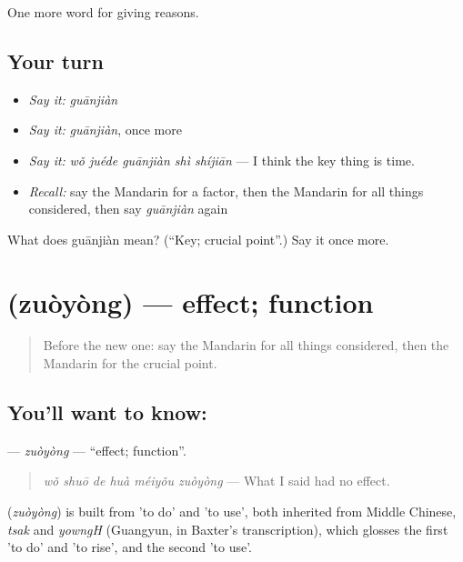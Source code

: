 \begin{grammarlens}[title={What you've built}]
One more word for giving reasons.
\end{grammarlens}

\subsection*{Your turn}
\begin{itemize}
\raggedright
  \item \emph{Say it:} \emph{guānjiàn}
  \item \emph{Say it:} \emph{guānjiàn}, once more
  \item \emph{Say it:} \emph{wǒ juéde guānjiàn shì shíjiān} — I think the key thing is time.
  \item \emph{Recall:} say the Mandarin for a factor, then the Mandarin for all things considered, then say \emph{guānjiàn} again
\end{itemize}

\begin{tcolorbox}[breakable,colback=teal!4,colframe=teal!35!black,title={Before you move on}]
What does guānjiàn mean? (\textquotedblleft{}Key; crucial point\textquotedblright{}.) Say it once more.
\end{tcolorbox}
\section[\texorpdfstring{\zh{作用} (zuòyòng)}{作用 (zuòyòng)}]{ (zuòyòng) — effect; function}

\label{lesson:ZH-C370-zuoyong}



\begin{quote}
Before the new one: say the Mandarin for all things considered, then the Mandarin for the crucial point.
\end{quote}

\subsection*{You'll want to know: }
\textbf{} — \emph{zuòyòng} — \textquotedblleft{}effect; function\textquotedblright{}.

\begin{quote}
\textbf{} \emph{wǒ shuō de huà méiyǒu zuòyòng} — What I said had no effect.
\end{quote}

\begin{cousinweb}
\textbf{} (\emph{zuòyòng}) is built from  'to do' and  'to use', both inherited from Middle Chinese, \emph{tsak} and \emph{yowngH} (Guangyun, in Baxter's transcription), which glosses the first 'to do' and 'to rise', and the second 'to use'.
\end{cousinweb}

